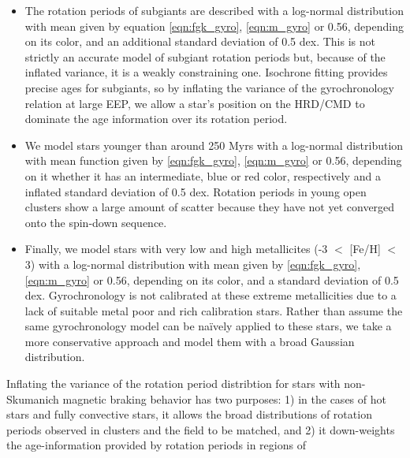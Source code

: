 {\begin{itemize}
{        If a star's age is greater than this, its mean rotation period is
        given by $P_\mathrm{max} = 2/\tau$, where $\tau$ is the convective
        turnover timescale, calculated via stellar mass using equation 11 from
        \citet{wright2011}.}
    \item{The rotation periods of subgiants are described with a log-normal
        distribution with mean given by equation \ref{eqn:fgk_gyro},
        \ref{eqn:m_gyro} or 0.56, depending on its color, and an additional
        standard deviation of 0.5 dex.
        This is not strictly an accurate model of subgiant rotation periods
        \citep[see, \eg][]{vansaders2013} but, because of the inflated
        variance, it is a weakly constraining one.
        Isochrone fitting provides precise ages for subgiants, so by inflating
        the variance of the gyrochronology relation at large EEP, we allow a
        star's position on the HRD/CMD to dominate the age information over
        its rotation period.}
    \item{We model stars younger than around 250 Myrs with a log-normal
        distribution with mean function given by \ref{eqn:fgk_gyro},
        \ref{eqn:m_gyro} or 0.56, depending on it whether it has
        an intermediate, blue or red color, respectively and a inflated
        standard deviation of 0.5 dex.
        Rotation periods in young open clusters show a large amount of scatter
        because they have not yet converged onto the \citet{skumanich1972}
        spin-down sequence.}
    \item{Finally, we model stars with very low and high metallicites (-3 $<$
        [Fe/H] $<$ 3) with a log-normal distribution with mean given by
        \ref{eqn:fgk_gyro}, \ref{eqn:m_gyro} or 0.56, depending on its color,
        and a standard deviation of 0.5 dex.
        Gyrochronology is not calibrated at these extreme metallicities due to
        a lack of suitable metal poor and rich calibration stars.
        Rather than assume the same gyrochronology model can be na\"ively
        applied to these stars, we take a more conservative approach and model
        them with a broad Gaussian distribution.}
\end{itemize}
Inflating the variance of the rotation period distribtion for stars with
non-Skumanich magnetic braking behavior has two purposes: 1) in the cases of
hot stars and fully convective stars, it allows the broad distributions of
rotation periods observed in clusters and the field to be matched, and 2) it
down-weights the age-information provided by rotation periods in regions of
}
